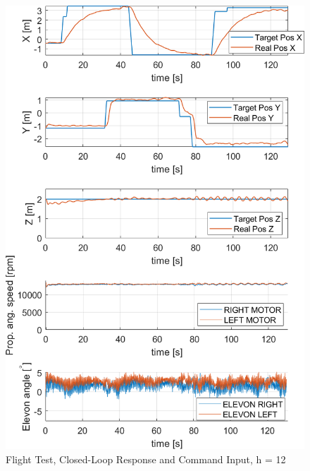\begin{figure}[h]
    \centering
\includegraphics[width=1\columnwidth]{figures/realflight_z_adjust_x_adjust_final_HopeCrop.png}
   \vspace{-0.5cm}\caption{Flight Test, Closed-Loop Response and Command Input, h = 12}
    \label{SYSTUNE and Dabbene Flight Test Command}
\end{figure}

